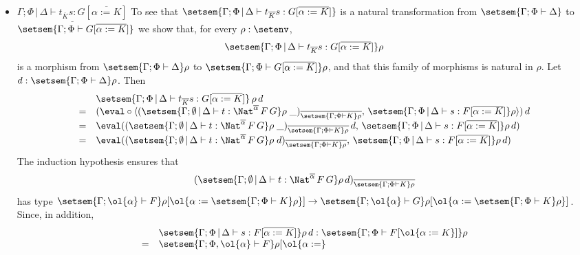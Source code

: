 \documentclass{lmcs}
\theoremstyle{plain}\newtheorem{satz}[thm]{Satz}
\begin{document}
\begin{itemize}
\item 
$\underline{\Gamma;\Phi \,|\, \Delta \vdash t_{\overline K} s: G
  [\overline{\alpha := K}]}$\; 
  To see that $\setsem{\Gamma;\Phi \,|\,
  \Delta \vdash t_{\overline K} s: G [\overline{\alpha := K}]}$ is a
  natural transformation from $\setsem{\Gamma; \Phi \vdash \Delta}$ to
  $\setsem{\Gamma;\Phi \vdash G [\overline{\alpha := K}]}$ we 
  show that, for every $\rho : \setenv$, \[\setsem{\Gamma;\Phi \,|\,
    \Delta \vdash t_{\overline K} s: G [\overline{\alpha := K}]}\rho\]
  is a morphism from $\setsem{\Gamma; \Phi \vdash \Delta}\rho$ to
  $\setsem{\Gamma;\Phi \vdash G [\overline{\alpha := K}]}\rho$, and
  that this family of morphisms is natural in $\rho$. Let $d :
  \setsem{\Gamma; \Phi \vdash \Delta}\rho$. Then
  \[\begin{array}{ll}
  & \setsem{\Gamma;\Phi \,|\, \Delta \vdash t_{\overline K} s: G
  [\overline{\alpha := K}]}\,\rho\,d\\
= & (\eval \circ \langle (\setsem{\Gamma; \emptyset \,|\, \Delta \vdash
  t : \Nat^{\overline{\alpha}} \,F \,G}\rho\;
\_)_{\overline{\setsem{\Gamma;\Phi \vdash K}\rho}},\,
\setsem{\Gamma;\Phi \,|\, \Delta \vdash s: F [\overline{\alpha :=
      K}]}\rho \rangle)\,d\\
= & \eval ((\setsem{\Gamma; \emptyset \,|\, \Delta \vdash t :
  \Nat^{\overline{\alpha}} \,F \,G}\rho\;
\_)_{\overline{\setsem{\Gamma;\Phi \vdash K}\rho}} \,d,\,
\setsem{\Gamma;\Phi \,|\, \Delta \vdash s: F [\overline{\alpha :=
      K}]}\rho\, d)\\
= & \eval ((\setsem{\Gamma; \emptyset \,|\, \Delta \vdash t :
  \Nat^{\overline{\alpha}} \,F \,G}\rho\;
d)_{\overline{\setsem{\Gamma;\Phi \vdash K}\rho}},\,
\setsem{\Gamma;\Phi \,|\, \Delta \vdash s: F [\overline{\alpha :=
      K}]}\rho\, d)\\
\end{array}\]
The induction hypothesis ensures that \[(\setsem{\Gamma; \emptyset \,|\,
  \Delta \vdash t : \Nat^{\overline{\alpha}} \,F \,G}\rho\,
d)_{\overline{\setsem{\Gamma;\Phi \vdash K}\rho}}\] has type
$\setsem{\Gamma; \ol{\alpha} \vdash F}\rho[\ol{\alpha :=
    \setsem{\Gamma;\Phi \vdash K}\rho}] \to \setsem{\Gamma;
  \ol{\alpha} \vdash G}\rho[\ol{\alpha := \setsem{\Gamma;\Phi \vdash
      K}\rho}]$.  Since, in addition, 
\[\begin{array}{ll}
  &\setsem{\Gamma;\Phi \,|\,
  \Delta \vdash s: F [\overline{\alpha := K}]}\rho\, d :
\setsem{\Gamma; \Phi \vdash F[\ol{\alpha := K}]}\rho \\ 
  =&\setsem{\Gamma; \Phi, \ol{\alpha} \vdash F}\rho[\ol{\alpha :=
}
\end{array}\]
\end{itemize}
\end{document}
